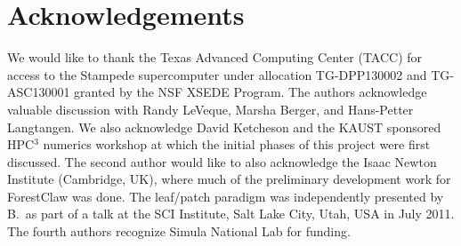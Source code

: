 \documentclass{IOS-Book-Article}     %
\newcommand{\forestclaw}{ForestClaw\xspace}
\newcommand{\pforest}{\texttt{p4est}\xspace}
\newcommand{\Fig}[1]{Figure~\ref{fig:#1}}
\begin{document}











%

\section*{Acknowledgements}

We would like to thank the Texas Advanced Computing Center (TACC) for access to
the Stampede supercomputer under allocation TG-DPP130002 and TG-ASC130001 granted by the NSF XSEDE Program. 
The authors acknowledge valuable discussion with Randy LeVeque, Marsha
Berger, and Hans-Petter Langtangen.  We also acknowledge David
Ketcheson and the KAUST sponsored HPC$^3$ numerics workshop at which
the initial phases of this project were first discussed.  The second
author would like to also acknowledge the Isaac Newton Institute
(Cambridge, UK), where much of the preliminary development work for
\forestclaw was done. The leaf/patch paradigm was independently
presented by B.\ as part of a talk at the SCI Institute, Salt Lake City, Utah,
USA in July 2011. The fourth authors recognize Simula National Lab for funding.





\end{document}
